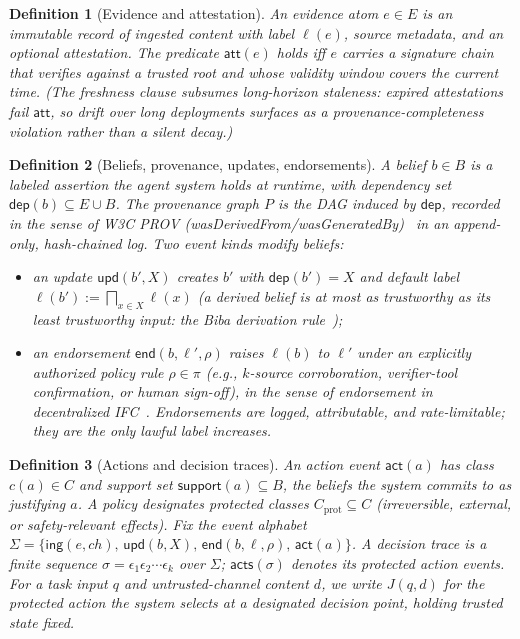 \documentclass[conference]{IEEEtran}
\newtheorem{definition}{Definition}
\newcommand{\att}{\ensuremath{\mathsf{att}}}
\newcommand{\deps}{\ensuremath{\mathsf{dep}}}
\newcommand{\support}{\ensuremath{\mathsf{support}}}
\newcommand{\acts}{\ensuremath{\mathsf{acts}}}
\newcommand{\ev}[1]{\ensuremath{\mathsf{#1}}}
\newcommand{\Cprot}{\ensuremath{C_{\mathrm{prot}}}}
\begin{document}
\begin{definition}[Evidence and attestation]
\label{def:evidence}
An \emph{evidence atom} $e \in E$ is an immutable record of
ingested content with label $\ell(e)$, source metadata, and an
optional attestation. The predicate $\att(e)$ holds iff $e$
carries a signature chain that verifies against a trusted root and
whose validity window covers the current time. (The freshness
clause subsumes long-horizon staleness: expired attestations fail
$\att$, so drift over long deployments surfaces as a
provenance-completeness violation rather than a silent decay.)
\end{definition}

\begin{definition}[Beliefs, provenance, updates, endorsements]
A \emph{belief} $b \in B$ is a labeled assertion the agent system
holds at runtime, with dependency set $\deps(b) \subseteq E \cup B$.
The \emph{provenance graph} $P$ is the DAG induced by $\deps$,
recorded in the sense of W3C PROV
(\textsf{wasDerivedFrom}/\textsf{wasGeneratedBy})~\cite{prov} in an
append-only, hash-chained log. Two event kinds modify beliefs:
\begin{itemize}[leftmargin=1.15em,itemsep=1pt]
\item an \emph{update} $\ev{upd}(b', X)$ creates $b'$ with
$\deps(b') = X$ and default label
$\ell(b') := \bigsqcap_{x \in X} \ell(x)$ (a derived belief is at
most as trustworthy as its least trustworthy input: the Biba
derivation rule~\cite{biba});
\item an \emph{endorsement} $\ev{end}(b, \ell', \rho)$ raises
$\ell(b)$ to $\ell'$ under an explicitly authorized policy rule
$\rho \in \pi$ (e.g., $k$-source corroboration, verifier-tool
confirmation, or human sign-off), in the sense of endorsement in
decentralized IFC~\cite{myersliskov}. Endorsements are logged,
attributable, and rate-limitable; they are the only lawful label
increases.
\end{itemize}
\end{definition}

\begin{definition}[Actions and decision traces]
An \emph{action event} $\ev{act}(a)$ has class $c(a) \in C$ and
\emph{support set} $\support(a) \subseteq B$, the beliefs the
system commits to as justifying $a$. A policy designates
\emph{protected classes} $\Cprot \subseteq C$ (irreversible,
external, or safety-relevant effects). Fix the event alphabet
$\Sigma = \{ \ev{ing}(e, ch),\, \ev{upd}(b, X),\, \ev{end}(b, \ell, \rho),\, \ev{act}(a) \}$.
A \emph{decision trace} is a finite sequence
$\sigma = \epsilon_1 \epsilon_2 \cdots \epsilon_k$ over $\Sigma$;
$\acts(\sigma)$ denotes its protected action events. For a task
input $q$ and untrusted-channel content $d$, we write $J(q, d)$
for the protected action the system selects at a designated
decision point, holding trusted state fixed.
\end{definition}
\end{document}
